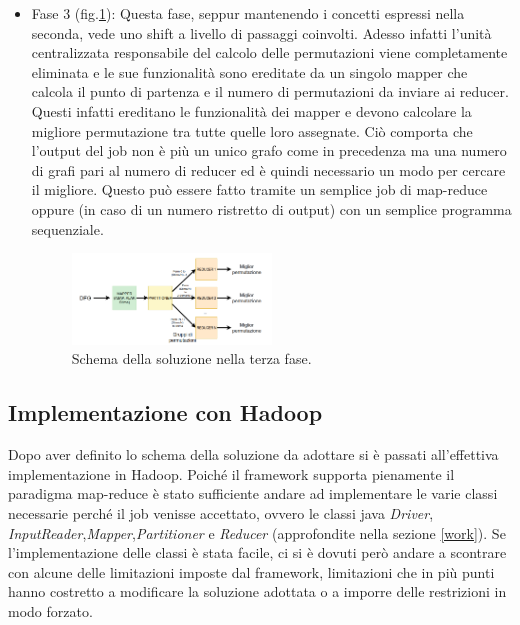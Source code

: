\documentclass[]{IEEEtran}
\begin{document}
\begin{itemize}
	\item Fase 3 (fig.\ref{sol_fase3}): Questa fase, seppur mantenendo i concetti espressi nella seconda, vede uno shift a livello di passaggi coinvolti. Adesso infatti l'unità centralizzata responsabile del calcolo delle permutazioni viene completamente eliminata e le sue funzionalità sono ereditate da un singolo mapper che calcola il punto di partenza e il numero di permutazioni da inviare ai reducer. Questi infatti ereditano le funzionalità dei mapper e devono calcolare la migliore permutazione tra tutte quelle loro assegnate. Ciò comporta che l'output del job non è più un unico grafo come in precedenza ma una numero di grafi pari al numero di reducer ed è quindi necessario un modo per cercare il migliore. Questo può essere fatto tramite un semplice job di map-reduce oppure (in caso di un numero ristretto di output) con un semplice programma sequenziale.
	\begin{figure}[htp]
		\includegraphics[width=0.5\textwidth]{images/sol_schema3.png}
		\caption{Schema della soluzione nella terza fase.}
		\label{sol_fase3}
	\end{figure}
\end{itemize}
\subsection{Implementazione con Hadoop}
Dopo aver definito lo schema della soluzione da adottare si è passati all'effettiva implementazione in Hadoop. Poiché il framework supporta pienamente il paradigma map-reduce è stato sufficiente andare ad implementare le varie classi necessarie perché il job venisse accettato, ovvero le classi java \emph{Driver}, \emph{InputReader},\emph{Mapper},\emph{Partitioner} e \emph{Reducer} (approfondite nella sezione \ref{work}). Se l'implementazione delle classi è stata facile, ci si è dovuti però andare a scontrare con alcune delle limitazioni imposte dal framework, limitazioni che in più punti hanno costretto a modificare la soluzione adottata o a imporre delle restrizioni in modo forzato.
\end{document}
